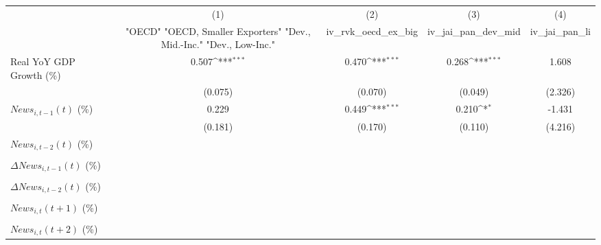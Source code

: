 {
\def\sym#1{\ifmmode^{#1}\else\(^{#1}\)\fi}
\begin{tabular}{l*{4}{c}}
\toprule
                    &\multicolumn{1}{c}{(1)}&\multicolumn{1}{c}{(2)}&\multicolumn{1}{c}{(3)}&\multicolumn{1}{c}{(4)}\\
                    &\multicolumn{1}{c}{ "OECD" "OECD, Smaller Exporters" "Dev., Mid.-Inc." "Dev., Low-Inc."}&\multicolumn{1}{c}{iv_rvk_oecd_ex_big}&\multicolumn{1}{c}{iv_jai_pan_dev_mid}&\multicolumn{1}{c}{iv_jai_pan_li}\\
\midrule
Real YoY GDP Growth (\%)&       0.507\sym{***}&       0.470\sym{***}&       0.268\sym{***}&       1.608         \\
                    &     (0.075)         &     (0.070)         &     (0.049)         &     (2.326)         \\
\addlinespace
$ News_{i,t-1}(t)$ (\%)&       0.229         &       0.449\sym{***}&       0.210\sym{*}  &      -1.431         \\
                    &     (0.181)         &     (0.170)         &     (0.110)         &     (4.216)         \\
\addlinespace
$ News_{i,t-2}(t)$ (\%)&                     &                     &                     &                     \\
                    &                     &                     &                     &                     \\
\addlinespace
$ \Delta News_{i,t-1}(t)$ (\%)&                     &                     &                     &                     \\
                    &                     &                     &                     &                     \\
\addlinespace
$ \Delta News_{i,t-2}(t)$ (\%)&                     &                     &                     &                     \\
                    &                     &                     &                     &                     \\
\addlinespace
$ News_{i,t}(t+1)$ (\%)&                     &                     &                     &                     \\
                    &                     &                     &                     &                     \\
\addlinespace
$ News_{i,t}(t+2)$ (\%)&                     &                     &                     &                     \\

\end{tabular}}
